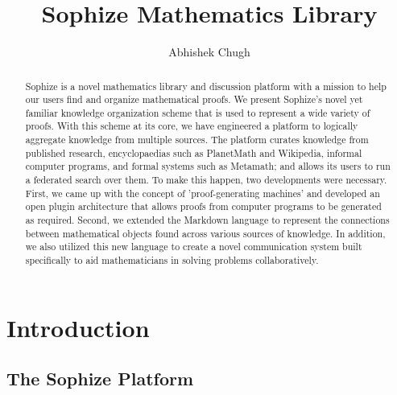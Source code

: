 \documentclass[runningheads]{llncs}
\begin{document}
%
\title{Sophize Mathematics Library}
%
%
\author{Abhishek Chugh}
%
%
%
\maketitle              %
%
\begin{abstract}
Sophize is a novel mathematics library and discussion platform with a mission to help our
users find and organize mathematical proofs. We present Sophize's novel yet familiar
knowledge organization scheme that is used to represent a wide variety of proofs. With this
scheme at its core, we have engineered a platform to logically aggregate knowledge from
multiple sources. The platform curates knowledge from published research, encyclopaedias
such as PlanetMath and Wikipedia, informal computer programs, and formal systems such as
Metamath; and allows its users to run a federated search over them. To make this happen, two
developments were necessary. First, we came up with the concept of 'proof-generating
machines' and developed an open plugin architecture that allows proofs from computer
programs to be generated as required. Second, we extended the Markdown language to represent
the connections between mathematical objects found across various sources of knowledge. In
addition, we also utilized this new language to create a novel communication system built
specifically to aid mathematicians in solving problems collaboratively.


\end{abstract}


\section{Introduction}

\subsection{The Sophize Platform}
\end{document}
